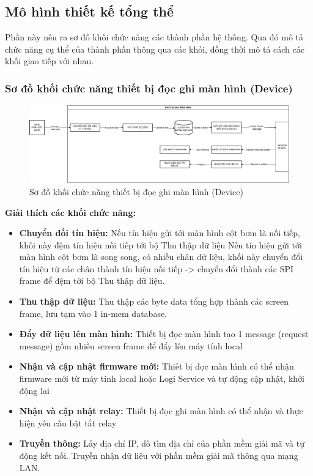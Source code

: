 \subsection{Mô hình thiết kế tổng thể}

\hspace{0.8cm} Phần này nêu ra sơ đồ khối chức năng các thành phần hệ thống. Qua đó mô tả chức năng cụ thể của thành phần thông qua các khối, đồng thời mô tả cách các khối giao tiếp với nhau.

\subsubsection{Sơ đồ khối chức năng thiết bị đọc ghi màn hình (Device)}

\begin{figure}[!ht]
    \centering
    \includegraphics[width=1.0\linewidth]{Figures/Chap3_Device-FunctionBlock.png}
    \caption{Sơ đồ khối chức năng thiết bị đọc ghi màn hình (Device)}
    \label{fig:hinh3.2}
\end{figure}

\textbf{Giải thích các khối chức năng:} 

\begin{itemize}
    \item \textbf{Chuyển đối tín hiệu: }
    \subitem Nếu tín hiệu gửi tới màn hình cột bơm là nối tiếp, khối này đệm tín hiệu nối tiếp tới bộ Thu thập dữ liệu
    \subitem Nếu tín hiệu gửi tới màn hình cột bơm là song song, có nhiều chân dữ liệu, khối này chuyển đổi tín hiệu từ các chân thành tín hiệu nối tiếp -> chuyển đổi thành các SPI frame để đệm tới bộ Thu thập dữ liệu.
    \item \textbf{Thu thập dữ liệu: } Thu thập các byte data tổng hợp thành các screen frame, lưu tạm vào 1 in-mem database.
    \item \textbf{Đẩy dữ liệu lên màn hình: } Thiết bị đọc màn hình tạo 1 message (request message) gồm nhiều screen frame để đẩy lên máy tính local
    \item \textbf{Nhận và cập nhật firmware mới: } Thiết bị đọc màn hình có thể nhận firmware mới từ máy tính local hoặc Logi Service và tự động cập nhật, khởi động lại
    \item \textbf{Nhận và cập nhật relay:} Thiết bị đọc ghi màn hình có thể nhận và thực hiện yêu cầu bật tắt relay 
    \item \textbf{Truyền thông:} Lấy địa chỉ IP, dò tìm địa chỉ của phần mềm giải mã và tự động kết nối. Truyền nhận dữ liệu với phần mềm giải mã thông qua mạng LAN.

\end{itemize}

